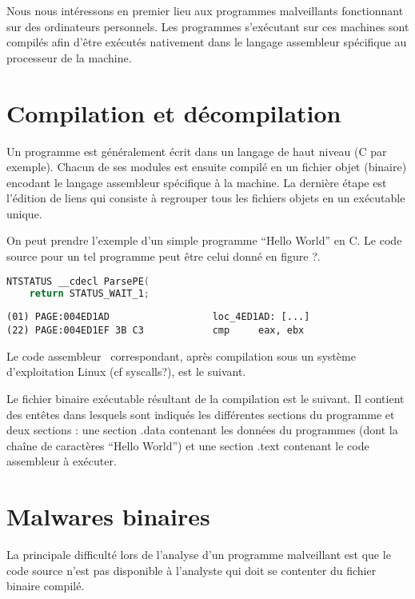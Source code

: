 
Nous nous intéressons en premier lieu aux programmes malveillants fonctionnant sur des ordinateurs personnels.
Les programmes s'exécutant sur ces machines sont compilés afin d'être exécutés nativement dans le langage assembleur spécifique au processeur de la machine.

\section{Compilation et décompilation}
Un programme est généralement écrit dans un langage de haut niveau (C par exemple). Chacun de ses modules est ensuite compilé en un fichier objet (binaire) encodant le langage assembleur spécifique à la machine. La dernière étape est l'édition de liens qui consiste à regrouper tous les fichiers objets en un exécutable unique.

On peut prendre l'exemple d'un simple programme ``Hello World'' en C. Le code source pour un tel programme peut être celui donné en figure ?.

\begin{lstlisting}[language={C}]
NTSTATUS __cdecl ParsePE(
    return STATUS_WAIT_1; 
\end{lstlisting}


\begin{lstlisting}[language={[x86masm]Assembler}, escapechar=~]
(01) PAGE:004ED1AD                  loc_4ED1AD: [...]                      
(22) PAGE:004ED1EF 3B C3            cmp     eax, ebx
\end{lstlisting}

Le code assembleur \xq\ correspondant, après compilation sous un système d'exploitation Linux (cf syscalls?), est le suivant.

Le fichier binaire exécutable résultant de la compilation est le suivant. Il contient des entêtes dans lesquels sont indiqués les différentes sections du programme et deux sections : une section .data contenant les données du programmes (dont la chaîne de caractères ``Hello World'') et une section .text contenant le code assembleur à exécuter.
\section{Malwares binaires}
La principale difficulté lors de l'analyse d'un programme malveillant est que le code source n'est pas disponible à l'analyste qui doit se contenter du fichier binaire compilé.

